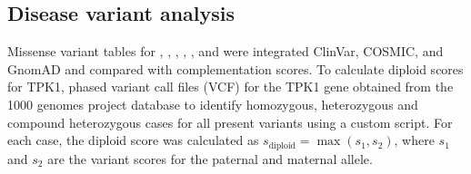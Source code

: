 \subsection{Disease variant analysis}
Missense variant tables for , , , , ,  and  were integrated ClinVar, COSMIC, and GnomAD and compared with complementation scores. To calculate diploid scores for TPK1, phased variant call files (VCF) for the TPK1 gene obtained from the 1000 genomes project database to identify homozygous, heterozygous and compound heterozygous cases for all present variants using a custom script. For each case, the diploid score was calculated as $s_\text{diploid} = \max(s_1,s_2)$, where $s_1$ and $s_2$ are the variant scores for the paternal and maternal allele.